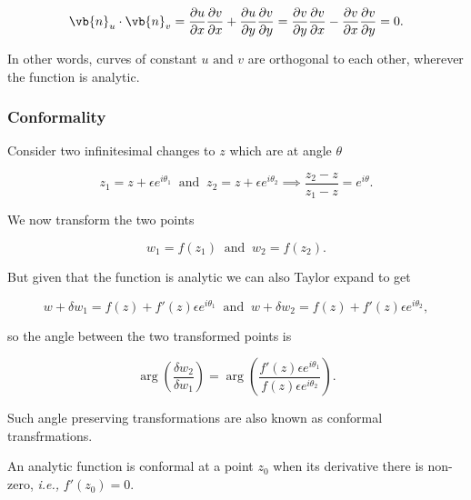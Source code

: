 \documentclass[english,a4paper,12pt]{report}
\begin{document}
\begin{equation}
    \vb{n} _{u} \cdot \vb{n} _{v} = \frac{\partial u}{\partial x} \frac{\partial v}{\partial x} + \frac{\partial u}{\partial y}  \frac{\partial v}{\partial y} = \frac{\partial v}{\partial y} \frac{\partial v}{\partial x} - \frac{\partial v}{\partial x} \frac{\partial v}{\partial y} =0.  
\end{equation}

In other words, curves of constant \(u \text { and } v\) are orthogonal to each other, wherever the function is analytic.

\subsubsection{Conformality}

Consider two infinitesimal changes to \(z\)  which are at angle \(\theta \)

\begin{equation}
    z_1 = z+ \epsilon e^{i \theta _{1} } ~\text { and }~ z_2 = z+ \epsilon e^{i \theta _{2} } \implies \frac{z_2 -z}{z_1 -z} = e^{i \theta }.    
\end{equation}

We now transform the two points 

\begin{equation}
    w_{1} = f(z_1 ) ~\text { and }~ w_{2} = f(z_2 ).  
\end{equation}

But given that the function is analytic we can also Taylor expand to get 

\begin{equation}
    w+\delta w_1 = f(z) + f'(z)\epsilon e^{i \theta _{1} } ~\text { and }~ w+\delta w_2 = f(z) + f'(z)\epsilon  e^{i \theta _{2} },
\end{equation}

so the angle between the two transformed points is 

\begin{equation}
    \arg \left( \frac{\delta w_2 }{\delta w_1 }  \right) = \arg \left( \frac{f'(z)\epsilon e^{i \theta _{1} } }{f(z)\epsilon e^{i \theta _{2} } }  \right).
\end{equation}

Such angle preserving transformations are also known as conformal transfrmations.

An analytic function is conformal at a point \(z_0 \) when its derivative there is non-zero, \textit{i.e.,} \(f'(z_0 )=0\).  
\end{document}
